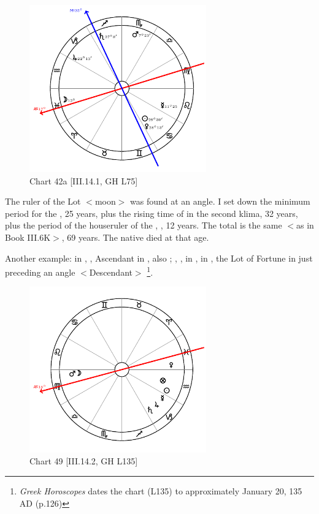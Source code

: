 \clearpage
\begin{figure}
\centering
\vspace{-20pt}
\includegraphics[width=0.68\textwidth]{charts/3_06_1}
\caption{Chart 42a [III.14.1, GH L75]}
\label{fig:chart42a}
\end{figure}  

The ruler of the Lot $<$moon$>$ was found at an angle. I set down the minimum period for the \Moon, 25 years, plus the rising time of \Cancer\xspace in the second klima, 32 years, plus the period of the houseruler of the \Moon, \Jupiter, 12 years. The total is the same $<$as in Book III.6K$>$, 69
years. The native died at that age.

\newpage
Another example: \Sun\xspace in \Aquarius, \Moon, Ascendant in \Virgo, also \Mars; \Saturn, \Jupiter, \Mercury\xspace in \Capricorn, \Venus\xspace in \Pisces, the Lot of Fortune in \Aquarius\xspace just preceding an angle $<$Descendant$>$
\footnote{\textit{Greek Horoscopes} dates the chart (L135) to approximately January 20, 135 AD (p.126)}.

\clearpage
\begin{figure}
\centering
\vspace{-20pt}
\includegraphics[width=0.68\textwidth]{charts/3_14_2}
\caption{Chart 49 [III.14.2, GH L135]}
\label{fig:chart49}
\end{figure} 

